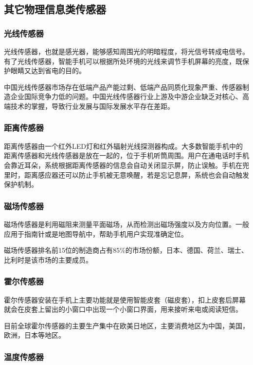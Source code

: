 \documentclass[lang=cn]{elegantpaper}
\begin{document}
\subsection{其它物理信息类传感器}

\subsubsection{光线传感器}

光线传感器，也就是感光器，能够感知周围光的明暗程度，将光信号转成电信号。有了光线传感器，智能手机可以根据所处环境的光线来调节手机屏幕的亮度，既保护眼睛又达到省电的目的。\cite{TraditionalUsageOfSendor}

中国光线传感器市场存在低端产品产能过剩、低端产品同质化现象严重、传感器制造企业国际竞争力低的问题。中国光线传感器行业上游及中游企业缺乏对核心、高端技术的掌握，导致行业发展与国际发展水平存在差距。

\subsubsection{距离传感器}

距离传感器由一个红外LED灯和红外辐射光线探测器构成。大多数智能手机中的距离传感器和光线传感器是放在一起的，位于手机听筒周围。用户在通电话时手机会靠近耳朵，系统根据距离传感器的信息会自动关闭显示屏，防止误触。手机在兜里时，距离感应器还可以防止手机被无意唤醒，若是忘记息屏，系统也会自动触发保护机制。

\subsubsection{磁场传感器}

磁场传感器是利用磁阻来测量平面磁场，从而检测出磁场强度以及方向位置。一般应用于指南针或是地图导航中，帮助手机用户实现准确定位。

磁场传感器排名前15位的制造商占有85\%的市场份额，日本、德国、荷兰、瑞士、比利时是该市场的主要成员。

\subsubsection{霍尔传感器}

霍尔传感器安装在手机上主要功能就是使用智能皮套（磁皮套），扣上皮套后屏幕就会在皮套上留出的小窗口中出现一个小窗口界面，用来接听来电或阅读短信。

目前全球霍尔传感器的主要生产集中在欧美日地区，主要消费地区为中国，美国，欧洲，日本等地区。

\subsubsection{温度传感器}
\end{document}
